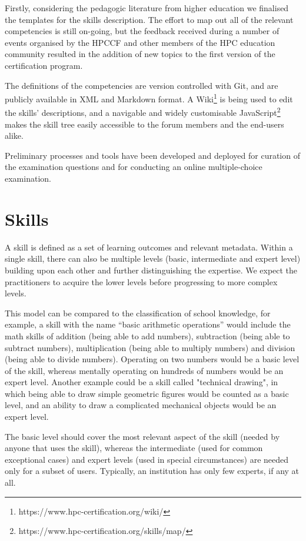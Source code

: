 \documentclass[jocse]{jocseart}
\begin{document}
Firstly, considering the pedagogic literature from higher education we finalised the templates for the skills description. 
The effort to map out all of the relevant competencies is still on-going, but the feedback received during a number of events organised by the HPCCF and other members of the HPC education community resulted in the addition of new topics to the first version of the certification program. 

The definitions of the competencies are version controlled with Git, and are publicly available in XML and Markdown format.
A Wiki\footnote{https://www.hpc-certification.org/wiki/} is being used to edit the skills' descriptions, and a navigable and widely customisable JavaScript\footnote{https://www.hpc-certification.org/skills/map/} makes the skill tree easily accessible to the forum members and the end-users alike.

Preliminary processes and tools have been developed and deployed for curation of the examination questions and for conducting an online multiple-choice examination.

\section{Skills}
\label{sec:skills}

A skill is defined as a set of learning outcomes and relevant metadata. 
Within a single skill, there can also be multiple levels (basic, intermediate and expert level) building upon each other and further distinguishing the expertise. 
We expect the practitioners to acquire the lower levels before progressing to more complex levels.

This model can be compared to the classification of school knowledge, for example, a skill with the name “basic arithmetic operations” would include the math skills of addition (being able to add numbers), subtraction (being able to subtract numbers), multiplication (being able to multiply numbers) and division (being able to divide numbers). Operating on two numbers would be a basic level of the skill, whereas mentally operating on hundreds of numbers would be an expert level. Another example could be a skill called "technical drawing", in which being able to draw simple geometric figures would be counted as a basic level, and an ability to draw a complicated mechanical objects would be an expert level. 

The basic level should cover the most relevant aspect of the skill (needed by anyone that uses the skill), whereas the intermediate (used for common exceptional cases) and expert levels (used in special circumstances)  are needed only for a subset of users.
Typically, an institution has only few experts, if any at all.
\end{document}
